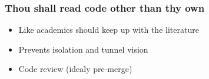 \documentclass[slidestop]{beamer}
\begin{document}
\begin{frame}
  \frametitle{Thou shall read code other than thy own}
  \begin{itemize}
    \item Like academics should keep up with the literature
    \item Prevents isolation and tunnel vision
    \item Code review (idealy pre-merge)
  \end{itemize}
\end{frame}

{
  \frame{}
}

{
  \frame{}
}
\end{document}
